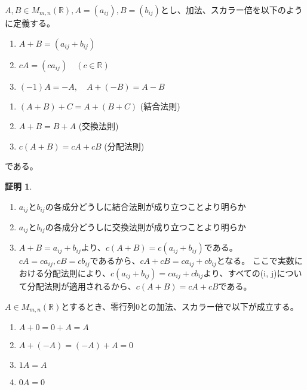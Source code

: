 \documentclass[dvipdfmx,autodetect-engine]{jsarticle}
\theoremstyle{definition}
\newtheorem*{Proof*}{証明}
\begin{document}
\label{defi:additionAndScalarMultiple}

$A, B \in M_{m,n}(\mathbb{R}), A = (a_{ij}), B = (b_{ij})$とし、加法、スカラー倍を以下のように定義する。

\begin{enumerate}
\renewcommand{\labelenumi}{(\arabic{enumi})}
\item $A + B = (a_{ij} + b_{ij})$
\item $cA = (ca_{ij}) \quad (c \in \mathbb{R})$
\item $(-1)A = -A, \quad A + (-B) = A - B$
\end{enumerate}


\begin{enumerate}
\renewcommand{\labelenumi}{(\arabic{enumi})}
\item $(A + B) + C = A + (B + C)$ \quad (結合法則)
\item $A + B = B + A$ \quad (交換法則)
\item $c(A+B) = cA + cB$ \quad (分配法則)
\end{enumerate}

である。

\begin{Proof*}
\begin{enumerate}
\renewcommand{\labelenumi}{(\arabic{enumi})}
\item $a_{ij}とb_{ij}の各成分どうしに結合法則が成り立つことより明らか$
\item $a_{ij}とb_{ij}の各成分どうしに交換法則が成り立つことより明らか$
\item $A + B = a_{ij} + b_{ij}$より、$c(A + B) = c(a_{ij} + b_{ij})$である。
$cA = ca_{ij}, cB = cb_{ij}$であるから、$cA + cB = ca_{ij} + cb_{ij}$となる。
ここで実数における分配法則により、$c(a_{ij} + b_{ij}) = ca_{ij} + cb_{ij}$より、すべての(i, j)について分配法則が適用されるから、$c(A+B) = cA + cB$である。
\end{enumerate}
\end{Proof*}


$A \in M_{m,n}(\mathbb{R})$とするとき、零行列$0$との加法、スカラー倍で以下が成立する。

\begin{enumerate}
\renewcommand{\labelenumi}{(\arabic{enumi})}
\item $A + 0 = 0 + A = A$
\item $A + (-A) = (-A) + A = 0$
\item $1A = A$
\item $0A = 0$
\end{enumerate}
\end{document}
